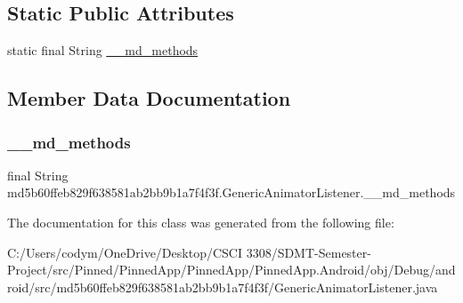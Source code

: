 \subsection*{Static Public Attributes}
\begin{DoxyCompactItemize}
\item 
static final String \hyperlink{classmd5b60ffeb829f638581ab2bb9b1a7f4f3f_1_1_generic_animator_listener_a2cc0ec65c1c849bc5bff6baeb2599d15}{\+\_\+\+\_\+md\+\_\+methods}
\end{DoxyCompactItemize}


\subsection{Member Data Documentation}
\mbox{\label{classmd5b60ffeb829f638581ab2bb9b1a7f4f3f_1_1_generic_animator_listener_a2cc0ec65c1c849bc5bff6baeb2599d15}} 
\subsubsection{\texorpdfstring{\+\_\+\+\_\+md\+\_\+methods}{\_\_md\_methods}}
{\footnotesize\ttfamily final String md5b60ffeb829f638581ab2bb9b1a7f4f3f.\+Generic\+Animator\+Listener.\+\_\+\+\_\+md\+\_\+methods\hspace{0.3cm}{\ttfamily [static]}}



The documentation for this class was generated from the following file\+:\begin{DoxyCompactItemize}
\item 
C\+:/\+Users/codym/\+One\+Drive/\+Desktop/\+C\+S\+C\+I 3308/\+S\+D\+M\+T-\/\+Semester-\/\+Project/src/\+Pinned/\+Pinned\+App/\+Pinned\+App/\+Pinned\+App.\+Android/obj/\+Debug/android/src/md5b60ffeb829f638581ab2bb9b1a7f4f3f/Generic\+Animator\+Listener.\+java\end{DoxyCompactItemize}
